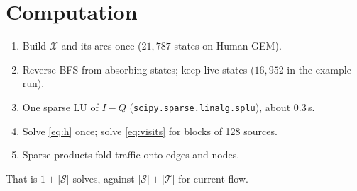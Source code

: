 \documentclass[11pt]{article}
\newcommand{\code}[1]{\texttt{#1}}
\newcommand{\Sset}{\mathcal{S}}
\newcommand{\Tset}{\mathcal{T}}
\newcommand{\X}{\mathcal{X}}
\begin{document}
\section{Computation}
\begin{enumerate}[nosep]
  \item Build $\X$ and its arcs once ($21{,}787$ states on Human-GEM).
  \item Reverse BFS from absorbing states; keep live states ($16{,}952$ in the example run).
  \item One sparse LU of $I-Q$ (\code{scipy.sparse.linalg.splu}), about $0.3$\,s.
  \item Solve \eqref{eq:h} once; solve \eqref{eq:visits} for blocks of 128 sources.
  \item Sparse products fold traffic onto edges and nodes.
\end{enumerate}
That is $1+|\Sset|$ solves, against $|\Sset|+|\Tset|$ for current flow.

\end{document}

